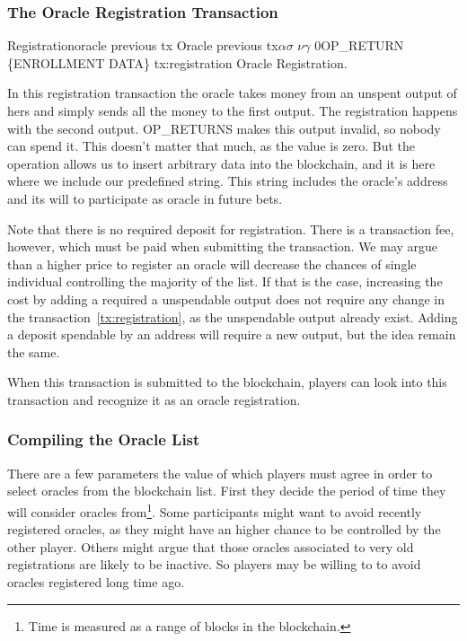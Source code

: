 \subsubsection{The Oracle Registration Transaction}

\transaction
    {Registration}{oracle previous tx}
      {Oracle previous tx}{$\alpha$}{$\sigma$}
      \stopinputs
      {$\nu$}{$\gamma$}
      {$0$}{OP\_RETURN \{ENROLLMENT DATA\}}
      \stopoutputs
      {tx:registration}
      {Oracle Registration.}

In this registration transaction the oracle takes money from an unspent output
  of hers and simply sends all the money to the first output.
The registration happens with the second output. OP\_RETURNS makes this output
  invalid, so nobody can spend it.
This doesn't matter that much, as the value is zero.
But the operation allows us to insert arbitrary data into the blockchain, and it
  is here where we include our predefined string. This string includes the
  oracle's address and its will to participate as oracle in future bets.

Note that there is no required deposit for registration. There is a
  transaction fee, however, which must be paid when submitting the transaction.
We may argue than a higher price to register an oracle will decrease the
  chances of single individual controlling the majority of the list.
If that is the case, increasing the cost by adding a required a unspendable
output does not require any change in the transaction~\ref{tx:registration},
  as the unspendable output already exist.
Adding a deposit spendable by an address will require a new output, but the
  idea remain the same.

When this transaction is submitted to the blockchain, players can look into
  this transaction and recognize it as an oracle registration.

\subsubsection{Compiling the Oracle List}

There are a few parameters the value of which players must agree in order to
  select oracles from the blockchain list.
First they decide the period of time they will consider oracles from\footnote{%
  Time is measured as a range of blocks in the blockchain.}.
Some participants might want to avoid recently registered oracles, as they might
  have an higher chance to be controlled by the other player.
Others might argue that those oracles associated to very old registrations
  are likely to be inactive.
So players may be willing to to avoid oracles registered long time ago.

